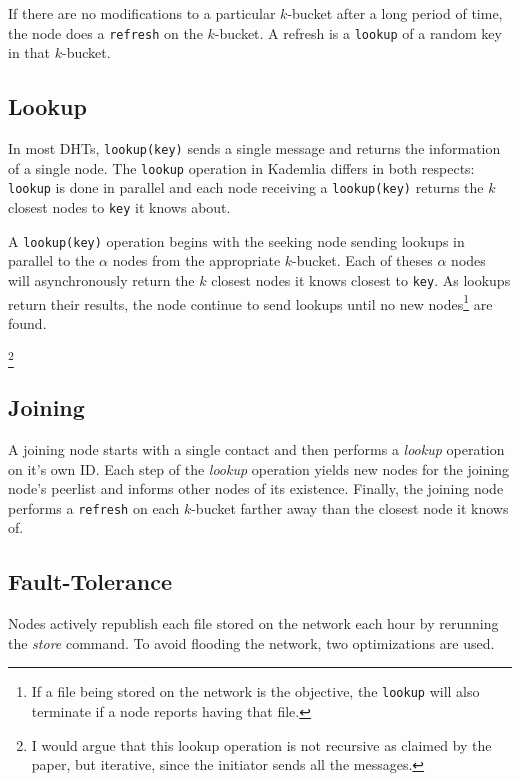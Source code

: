 \documentclass[10pt,letterpaper,twoside]{report}
\begin{document}
If there are no modifications to a particular $k$-bucket after a long period of time, the node does a \texttt{refresh} on the $k$-bucket.
A refresh is a \texttt{lookup} of a random key in that $k$-bucket.



\subsection*{Lookup}
In most DHTs, \texttt{lookup(key)} sends a single message and returns the information  of a single node.
The \texttt{lookup} operation in Kademlia differs in both respects:  \texttt{lookup} is done in parallel and each node receiving  a \texttt{lookup(key)} returns the $k$ closest nodes to \texttt{key} it knows about.


A \texttt{lookup(key)} operation begins with the seeking node sending lookups in parallel to the $\alpha$ nodes from the appropriate $k$-bucket.
Each of theses $\alpha$ nodes will asynchronously return the $k$ closest nodes it knows closest to \texttt{key}.
As lookups return their results, the node continue to send lookups until no new nodes\footnote{If a file being stored on the network is the objective, the \texttt{lookup} will also terminate if a node reports having that file.} are found.  

\footnote{I would argue that this lookup operation is not recursive as claimed by the paper, but iterative, since the initiator sends all the messages.}

\subsection*{Joining}
A joining node starts with a single contact and then performs a \textit{lookup} operation on it's own ID.
Each step of the \textit{lookup} operation yields new nodes for the joining node's peerlist and informs other nodes of its existence.
Finally, the joining node performs a \texttt{refresh} on each $k$-bucket farther away than the closest node it knows of.




\subsection*{Fault-Tolerance}
Nodes actively republish each file stored on the network each hour by rerunning the \textit{store} command.  
To avoid flooding the network, two optimizations are used.
\end{document}
